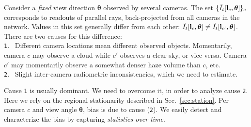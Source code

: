 \documentclass[runningheads]{llncs}
\begin{document}
%
%

Consider a {\em fixed} view direction ${\bm \theta}$ observed by several cameras.
The set $\{\tilde I_t[{\bf l}_c,{\bm \theta}]\}_c$ corresponds to readouts of parallel rays, back-projected from all cameras in the network. Values in this set generally differ from each other:
 $\tilde I_t[{\bf l}_c,{\bm \theta}]\neq \tilde I_t[{\bf l}_{c'},{\bm \theta}]$. There are two causes for this difference:\\
 {\tt 1}.~ Different camera locations mean different observed objects. Momentarily, camera $c$ may observe a cloud while $c'$ observes a clear sky, or vice versa. Camera $c'$ may momentarily observe a somewhat denser haze volume than $c$, etc. \\
 {\tt 2}.~ Slight inter-camera radiometric inconsistencies, which we need to estimate.\\
 \vspace{-0.2cm}

Cause {\tt 1} is usually dominant. We need to overcome it, in order to analyze cause {\tt 2}. Here we rely on the regional stationarity described in Sec.~\ref{sec:station}.
Per camera $c$ and view angle ${\bm \theta}$, bias is due to cause ({\tt 2}). We easily detect and characterize the bias by capturing {\em statistics over time}.
\end{document}
